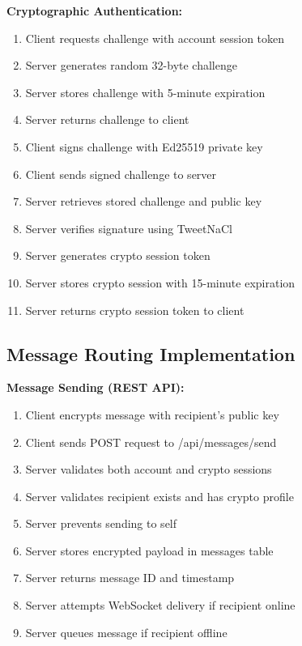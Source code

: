 \textbf{Cryptographic Authentication:}
\begin{enumerate}
    \item Client requests challenge with account session token
    \item Server generates random 32-byte challenge
    \item Server stores challenge with 5-minute expiration
    \item Server returns challenge to client
    \item Client signs challenge with Ed25519 private key
    \item Client sends signed challenge to server
    \item Server retrieves stored challenge and public key
    \item Server verifies signature using TweetNaCl
    \item Server generates crypto session token
    \item Server stores crypto session with 15-minute expiration
    \item Server returns crypto session token to client
\end{enumerate}

\subsection{Message Routing Implementation}

\textbf{Message Sending (REST API):}
\begin{enumerate}
    \item Client encrypts message with recipient's public key
    \item Client sends POST request to /api/messages/send
    \item Server validates both account and crypto sessions
    \item Server validates recipient exists and has crypto profile
    \item Server prevents sending to self
    \item Server stores encrypted payload in messages table
    \item Server returns message ID and timestamp
    \item Server attempts WebSocket delivery if recipient online
    \item Server queues message if recipient offline
\end{enumerate}

